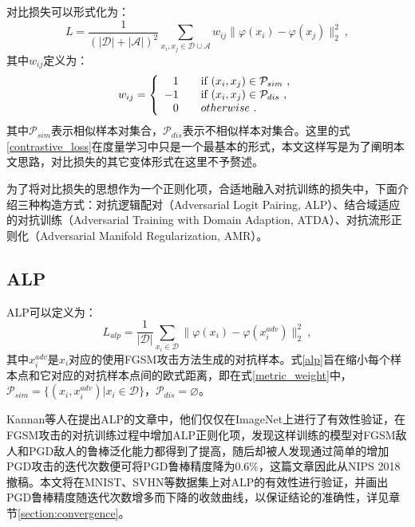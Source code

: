 对比损失可以形式化为：
\begin{equation}
    L
    = 
    \frac{1}{(|\mathcal{D}| + |\mathcal{A}|)^2} \sum_{x_i, x_j \in \mathcal{D} \cup \mathcal{A}} w_{ij}\big\|\varphi(x_i) - \varphi(x_j)\big\|_2^2
    \ ,
    \label{contrastive_loss}
\end{equation}
其中$w_{ij}$定义为：
\begin{equation}
    w_{ij} = \left\{
    \begin{array}{rl}
    1  & \quad \textnormal{if } (x_i, x_j) \in \mathcal{P}_{sim} \ ,\\
    -1 & \quad \textnormal{if } (x_i, x_j) \in \mathcal{P}_{dis} \ ,\\
    0  & \quad otherwise \ .
    \end{array} \right.
    \label{metric_weight}
\end{equation}
其中$\mathcal{P}_{sim}$表示相似样本对集合，$\mathcal{P}_{dis}$表示不相似样本对集合。这里的式\eqref{contrastive_loss}在度量学习中只是一个最基本的形式，本文这样写是为了阐明本文思路，对比损失的其它变体形式在这里不予赘述。

为了将对比损失的思想作为一个正则化项，合适地融入对抗训练的损失中，下面介绍三种构造方式：对抗逻辑配对（Adversarial Logit Pairing, ALP）\cite{kannan2018adversarial}、结合域适应的对抗训练（Adversarial Training with Domain Adaption, ATDA）\cite{song2018improving}、对抗流形正则化（Adversarial Manifold Regularization, AMR）。

\subsection{ALP} \label{section:alp}

ALP可以定义为：
\begin{equation}
    L_{alp}
    = 
    \frac{1}{|\mathcal{D}|} \sum_{x_i \in \mathcal{D}} \big\|\varphi(x_i) - \varphi(x_i^{adv})\big\|_2^2 \ ,
    \label{alp}
\end{equation}
其中$x_i^{adv}$是$x_i$对应的使用FGSM攻击方法生成的对抗样本。式\eqref{alp}旨在缩小每个样本点和它对应的对抗样本点间的欧式距离，即在式\eqref{metric_weight}中，$\mathcal{P}_{sim} = \{(x_i, x_i^{adv}) | x_i \in \mathcal{D} \}$，$\mathcal{P}_{dis} = \varnothing$。

Kannan等人在提出ALP的文章中，他们仅仅在ImageNet上进行了有效性验证，在FGSM攻击的对抗训练过程中增加ALP正则化项，发现这样训练的模型对FGSM敌人和PGD敌人的鲁棒泛化能力都得到了提高\cite{kannan2018adversarial}，随后却被人发现通过简单的增加PGD攻击的迭代次数便可将PGD鲁棒精度降为0.6\%\cite{engstrom2018evaluating}，这篇文章因此从NIPS 2018撤稿。本文将在MNIST、SVHN等数据集上对ALP的有效性进行验证，并画出PGD鲁棒精度随迭代次数增多而下降的收敛曲线，以保证结论的准确性，详见章节\ref{section:convergence}。

